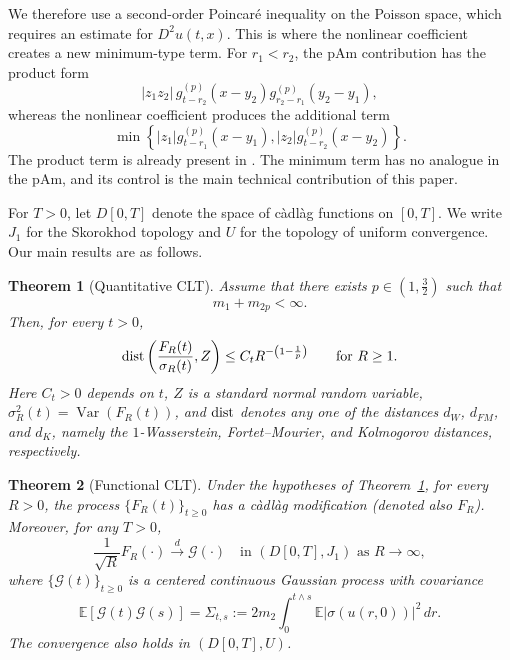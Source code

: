 \documentclass[12pt]{article}
\newtheorem{theorem}{Theorem}[section]
\def\cG{\mathcal{G}}
\def\bE{\mathbb{E}}
\begin{document}
\medskip



We therefore use a second-order Poincar\'e inequality on the Poisson
space, which requires an estimate for $D^2u(t,x)$. This is where the nonlinear
coefficient creates a new minimum-type term. For $r_1<r_2$, the pAm
contribution has the product form
\[
|z_1z_2|\,
g_{t-r_2}^{(p)}(x-y_2)
g_{r_2-r_1}^{(p)}(y_2-y_1),
\]
whereas the nonlinear coefficient produces the additional term
\begin{equation}
\label{min-term}
\min\left\{
|z_1|g_{t-r_1}^{(p)}(x-y_1),
|z_2|g_{t-r_2}^{(p)}(x-y_2)
\right\}.
\end{equation}
The product term is already present in \cite{BLW26}. The minimum term
has no analogue in the pAm, and its control is the main technical contribution
of this paper.


\medskip

 For $T>0$, let $D[0,T]$ denote the space of c\`adl\`ag functions on
$[0,T]$. We write $J_1$ for the Skorokhod topology and $U$ for the topology of
uniform convergence. Our main results are as follows.


\begin{theorem}[Quantitative CLT]
\label{QCLT}
Assume that there exists $p\in(1,\frac32)$ such that
\begin{equation}
\label{mp-m2p}
m_1+m_{2p}<\infty.
\end{equation}
Then, for every $t>0$,
\[
{\rm dist}\left(\frac{F_R(t)}{\sigma_R(t)},Z\right)
\le C_t R^{-\left(1-\frac1p\right)} \qquad \text{for } R\ge1.
\]
Here $C_t>0$ depends on $t$, $Z$ is a standard normal random variable,
$\sigma_R^2(t)=\operatorname{Var}(F_R(t))$, and ${\rm dist}$ denotes any one
of the distances $d_W$, $d_{FM}$, and $d_K$, namely the $1$-Wasserstein,
Fortet--Mourier, and Kolmogorov distances, respectively.
\end{theorem}

\begin{theorem}[Functional CLT]
\label{FCLT}
Under the hypotheses of Theorem~\ref{QCLT}, for every $R>0$, the process
$\{F_R(t)\}_{t\geq0}$ has a c\`adl\`ag modification (denoted also $F_R$).
Moreover, for any $T>0$,
\[
\frac{1}{\sqrt R}F_R(\cdot)\xrightarrow{d}\cG(\cdot)
\quad \mbox{in $(D[0,T],J_1)$ as $R\to\infty$},
\]
where $\{\cG(t)\}_{t\geq0}$ is a centered continuous Gaussian process with covariance
\[
\bE[\cG(t)\cG(s)]
=\Sigma_{t,s}
:=2m_2\int_0^{t\wedge s}\bE|\sigma(u(r,0))|^2\,dr.
\]
The convergence also holds in $(D[0,T],U)$.
\end{theorem}
\end{document}
